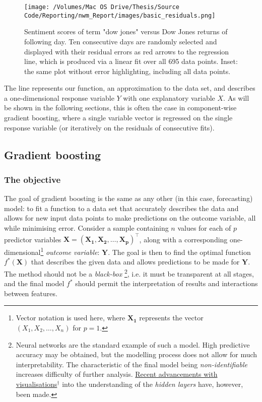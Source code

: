 \documentclass{article}
\begin{document}
\begin{figure}[htb]
\centering
\texttt{[image: /Volumes/Mac OS Drive/Thesis/Source Code/Reporting/nwm\_Report/images/basic\_residuals.png]}
\caption[An example of linear regression using sentiment analysis scores]{\label{fig:basic.residuals}Sentiment scores of term "dow jones" versus Dow Jones returns of following day. Ten consecutive days are randomly selected and displayed with their residual errors as red arrows to the regression line, which is produced via a linear fit over all 695 data points. Inset: the same plot without error highlighting, including all data points.}
\end{figure}

The line represents our function, an approximation to the data set, and describes a one-dimensional response variable $Y$ with one explanatory variable $X$. As will be shown in the following sections, this is often the case in component-wise gradient boosting, where a single variable vector is regressed on the single response variable (or iteratively on the residuals of consecutive fits).


\subsection{Gradient boosting \label{grad-boosting}}
\label{sec-5-3}


\subsubsection{The objective \label{basic-problem}}
\label{sec-5-3-1}

The goal of gradient boosting is the same as any other (in this case, forecasting) model: to fit a function to a data set that accurately describes the data and allows for new input data points to make predictions on the outcome variable, all while minimising error. Consider a sample containing $n$ values for each of $p$ predictor variables $\mathbf{X = (X_1, X_2, … , X_p)^\top}$, along with a corresponding one-dimensional\footnote{Vector notation is used here, where $\mathbf{X_1}$ represents the vector $(X_1, X_2, … , X_n)$ for $p = 1$.} \emph{outcome variable}: $\mathbf{Y}$. The goal is then to find the optimal function $f^* (\mathbf{X})$ that describes the given data and allows predictions to be made for $\mathbf{Y}$. The method should not be a \emph{black-box} \footnote{Neural networks are the standard example of such a model. High predictive accuracy may be obtained, but the modelling process does not allow for much interpretability. The characteristic of the final model being \emph{non-identifiable} increases difficulty of further analysis. \href{http://colah.github.io/posts/2014-03-NN-Manifolds-Topology/}{Recent advancements with visualisations$^{\dag{}}$} into the understanding of the \emph{hidden layers} have, however, been made.}, i.e. it must be transparent at all stages, and the final model $f^*$ should permit the interpretation of results and interactions between features.
\end{document}
